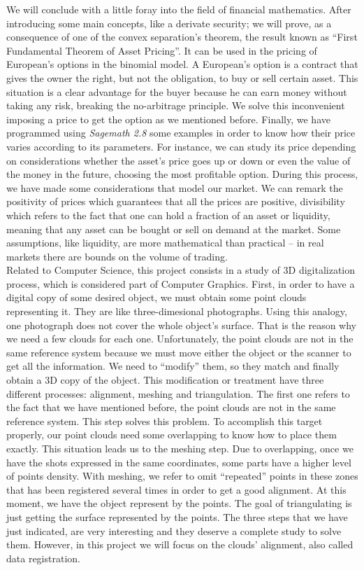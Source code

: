 We will conclude with a little foray into the field of financial mathematics. After introducing some main concepts, like a derivate security; we will prove, as a consequence of one of the convex separation's theorem, the result known as ``First Fundamental Theorem of Asset Pricing''. It can be used in the pricing of European's options in the binomial model. A European's option is a contract that gives the owner the right, but not the obligation, to buy or sell certain asset. This situation is a clear advantage for the buyer because he can earn money without taking any risk, breaking the no-arbitrage principle. We solve this inconvenient imposing a price to get the option as we mentioned before. Finally, we have programmed using \textit{Sagemath 2.8} some examples in order to know how their price varies according to its parameters. For instance, we can study its price depending on considerations whether the asset's price goes up or down or even the value of the money in the future, choosing the most profitable option. During this process, we have made some considerations that model our market. We can remark the positivity of prices which guarantees that all the prices are positive, divisibility which refers to the fact that one can hold a fraction of an asset or liquidity, meaning that any asset can be bought or sell on demand at the market. Some assumptions, like liquidity, are more mathematical than practical -- in real markets there are bounds on the volume of trading. \\

Related to Computer Science, this project consists in a study of 3D digitalization process, which is considered part of Computer Graphics. First, in order to have a digital copy of some desired object, we must obtain some point clouds representing it. They are like three-dimesional photographs. Using this analogy, one photograph does not cover the whole object's surface. That is the reason why we need a few clouds for each one. Unfortunately, the point clouds are not in the same reference system because we must move either the object or the scanner to get all the information. We need to ``modify'' them, so they match and finally obtain a 3D copy of the object. This modification or treatment have three different processes: alignment, meshing and triangulation. The first one refers to the fact that we have mentioned before, the point clouds are not in the same reference system. This step solves this problem. To accomplish this target properly, our point clouds need some overlapping to know how to place them exactly. This situation leads us to the meshing step. Due to overlapping, once we have the shots expressed in the same coordinates, some parts have a higher level of points density. With meshing, we refer to omit ``repeated'' points in these zones that has been registered several times in order to get a good alignment. At this moment, we have the object represent by the points. The goal of triangulating is just getting the surface represented by the points. The three steps that we have just indicated, are very interesting and they deserve a complete study to solve them. However, in this project we will focus on the clouds' alignment, also called data registration. \\

